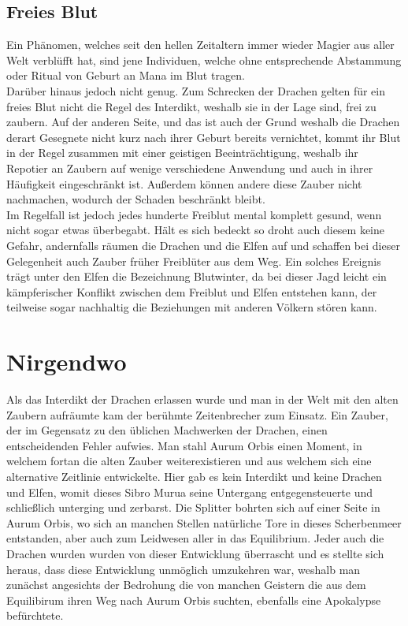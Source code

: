 \documentclass[a4paper,12pt,oneside]{book}
\begin{document}
\section{Freies Blut}
Ein Phänomen, welches seit den hellen Zeitaltern immer wieder Magier aus aller Welt verblüfft hat, sind jene Individuen, welche ohne entsprechende Abstammung oder Ritual von Geburt an Mana im Blut tragen.  
\\Darüber hinaus jedoch nicht genug. Zum Schrecken der Drachen gelten für ein freies Blut nicht die Regel des Interdikt, weshalb sie in der Lage sind, frei zu zaubern. Auf der anderen Seite, und das ist auch der Grund weshalb die Drachen derart Gesegnete nicht kurz nach ihrer Geburt bereits vernichtet, kommt ihr Blut in der Regel zusammen mit einer geistigen Beeinträchtigung, weshalb ihr Repotier an Zaubern auf wenige verschiedene Anwendung und auch in ihrer Häufigkeit eingeschränkt ist. Außerdem können andere diese Zauber nicht nachmachen, wodurch der Schaden beschränkt bleibt.
\\Im Regelfall ist jedoch jedes hunderte Freiblut mental komplett gesund, wenn nicht sogar etwas überbegabt. Hält es sich bedeckt so droht auch diesem keine Gefahr, andernfalls räumen die Drachen und die Elfen auf und schaffen bei dieser Gelegenheit auch Zauber früher Freiblüter aus dem Weg. Ein solches Ereignis trägt unter den Elfen die Bezeichnung Blutwinter, da bei dieser Jagd leicht ein kämpferischer Konflikt zwischen dem Freiblut und Elfen entstehen kann, der teilweise sogar nachhaltig die Beziehungen mit anderen Völkern stören kann.  

\chapter{Nirgendwo}
Als das Interdikt der Drachen erlassen wurde und man in der Welt mit den alten Zaubern aufräumte kam der berühmte Zeitenbrecher zum Einsatz. Ein Zauber, der im Gegensatz zu den üblichen Machwerken der Drachen, einen entscheidenden Fehler aufwies. Man stahl Aurum Orbis einen Moment, in welchem fortan die alten Zauber weiterexistieren und aus welchem sich eine alternative Zeitlinie entwickelte. Hier gab es kein Interdikt und keine Drachen und Elfen, womit dieses Sibro Murua seine Untergang entgegensteuerte und schließlich unterging und zerbarst. Die Splitter bohrten sich auf einer Seite in Aurum Orbis, wo sich an manchen Stellen natürliche Tore in dieses Scherbenmeer entstanden, aber auch zum Leidwesen aller in das Equilibrium. Jeder auch die Drachen wurden wurden von dieser Entwicklung überrascht und es stellte sich heraus, dass diese Entwicklung unmöglich umzukehren war, weshalb man zunächst angesichts der Bedrohung die von manchen Geistern die aus dem Equilibirum ihren Weg nach Aurum Orbis suchten, ebenfalls eine Apokalypse befürchtete.
\end{document}
